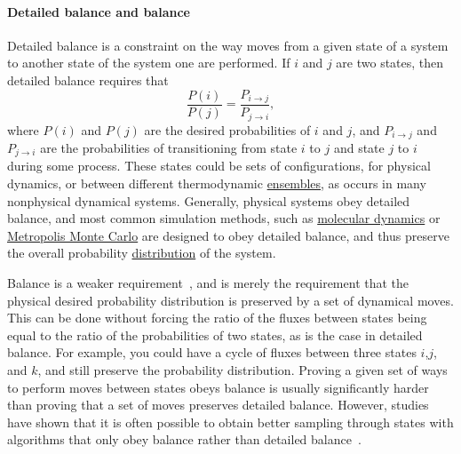 \documentclass[9pt,review]{livecoms}
\begin{document}
\hypertarget{ref:Balance} {\paragraph{Detailed balance and balance}}
Detailed balance is a constraint on the way moves from a given state of a system to another state of the system one are performed.  If $i$ and $j$ are two states, then detailed balance requires that
\begin{equation}
\frac{P(i)}{P(j)} = \frac{P_{i\rightarrow j}}{P_{j\rightarrow i}},
\end{equation}
where $P(i)$ and $P(j)$ are the desired probabilities of $i$ and $j$, and $P_{i\rightarrow j}$ and $P_{j\rightarrow i}$ are the probabilities of transitioning from state $i$ to $j$ and state $j$ to $i$ during some process. These states could be sets of configurations, for physical dynamics, or between different thermodynamic \hyperlink{ref:Ensemble} {ensembles}, as occurs in many nonphysical dynamical systems. Generally, physical systems obey detailed balance, and most common simulation methods, such as \hyperlink{ref:MolecularDynamics}{molecular dynamics} or \hyperlink{ref:MetropolisMonteCarlo}{Metropolis Monte Carlo} are designed to obey detailed balance, and thus preserve the overall probability \hyperlink{ref:Distribution}{distribution} of the system.

Balance is a weaker requirement~\cite{deem:jcp:1999:balance}, and is merely the requirement that the physical desired probability distribution is preserved by a set of dynamical moves. This can be done without forcing the ratio of the fluxes between states being equal to the ratio of the probabilities of two states, as is the case in detailed balance.  For example, you could have a cycle of fluxes between three states $i$,$j$, and $k$, and still preserve the probability distribution.  Proving a given set of ways to perform moves between states obeys balance is usually significantly harder than proving that a set of moves preserves detailed balance. However, studies have shown that it is often possible to obtain better sampling through states with algorithms that only obey balance rather than detailed balance~\citep{deem:jcp:1999:balance,Faizi:JCTC:2020}.
\end{document}
